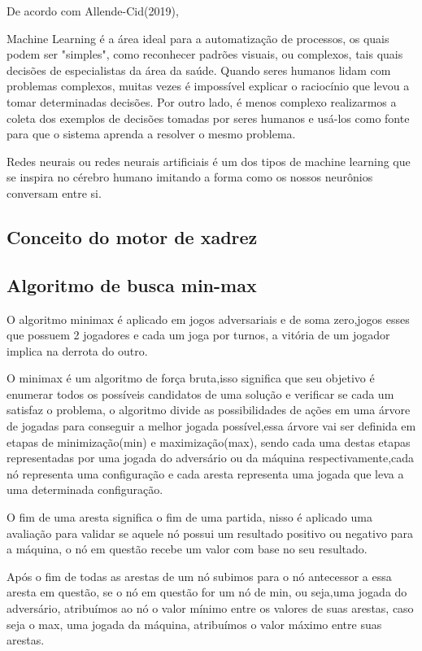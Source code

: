 De acordo com Allende-Cid(2019),
\begin{citacao}
    Machine Learning é a área ideal para a automatização de processos, os quais podem ser "simples", como reconhecer padrões visuais, ou complexos,
    tais quais decisões de especialistas da área da saúde. Quando seres humanos lidam com problemas complexos, muitas vezes é impossível explicar o raciocínio
    que levou a tomar determinadas decisões. Por outro lado, é menos complexo realizarmos a coleta dos exemplos de decisões tomadas por seres humanos e usá-los
    como fonte para que o sistema aprenda a resolver o mesmo problema.\cite[tradução dos editores]{ALLEND-CID}

\end{citacao}

Redes neurais ou redes neurais artificiais é um dos tipos de machine learning que se inspira no cérebro humano imitando a forma como
os nossos neurônios conversam entre si.

\subsection{Conceito do motor de xadrez}

\subsection{Algoritmo de busca min-max}
O algoritmo minimax é aplicado em jogos adversariais e de soma zero,jogos esses que possuem 2 jogadores e cada um joga
por turnos, a vitória de um jogador implica na derrota do outro.

O minimax é um algoritmo de força bruta,isso significa que seu objetivo é enumerar todos os possíveis candidatos de uma
solução e verificar se cada um satisfaz o problema, o algoritmo divide as possibilidades de ações em uma árvore de jogadas
para conseguir a melhor jogada possível,essa árvore vai ser definida em etapas de minimização(min) e maximização(max),
sendo cada uma destas etapas representadas por uma jogada do adversário ou da máquina respectivamente,cada nó representa
uma configuração e cada aresta representa uma jogada que leva a uma determinada configuração.

O fim de uma aresta significa o fim de uma partida, nisso é aplicado uma avaliação para validar se aquele nó possui
um resultado positivo ou negativo para a máquina, o nó em questão recebe um valor com base no seu resultado.

Após o fim de todas as arestas de um nó subimos para o nó antecessor a essa aresta em questão, se o nó em questão for um nó
de min, ou seja,uma jogada do adversário, atribuímos ao nó o valor mínimo entre os valores de suas arestas, caso seja o max,
uma jogada da máquina, atribuímos o valor máximo entre suas arestas.

